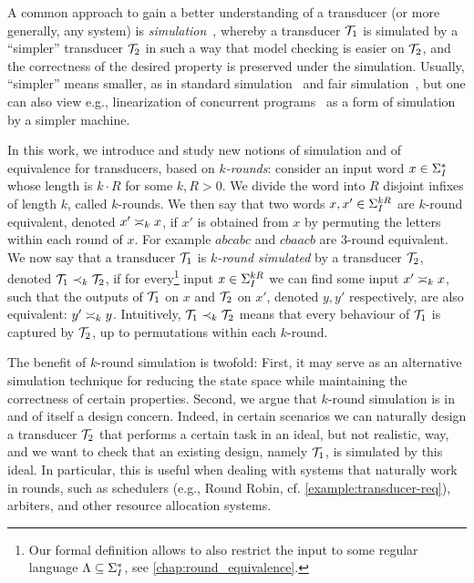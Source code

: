 A common approach to gain a better understanding of a transducer (or more generally, any system) is \emph{simulation}~\cite{Milner1971}, whereby a transducer $\cT_1$ is simulated by a ``simpler'' transducer $\cT_2$ in such a way that model checking is easier on $\cT_2$, and the correctness of the desired property is preserved under the simulation. Usually, ``simpler'' means smaller, as in standard simulation~\cite{Milner1971} and fair simulation~\cite{Henzinger1997}, but one can also view e.g., linearization of concurrent programs~\cite{Herlihy1987} as a form of simulation by a simpler machine.

In this work, we introduce and study new notions of simulation and of equivalence for transducers, based on \emph{$k$-rounds}: consider an input word $x\in \sI^*$ whose length is $k\cdot R$ for some $k,R>0$. We divide the word into $R$ disjoint infixes of length $k$, called $k$-rounds. We then say that two words $x,x'\in \sI^{kR}$ are $k$-round equivalent, denoted $x'\req[k]x$, if $x'$ is obtained from $x$ by permuting the letters within each round of $x$. For example $abcabc$ and $cbaacb$ are $3$-round equivalent. We now say that a transducer $\cT_1$ is \emph{$k$-round simulated} by a transducer $\cT_2$, denoted $\cT_1\prec_{k} \cT_2$, if for every\footnote{Our formal definition allows to also restrict the input to some regular language $\fL\subseteq \sI^*$, see \autoref{chap:round_equivalence}.} input $x\in \sI^{kR}$ we can find some input $x'\req[k]x$, such that the outputs of $\cT_1$ on $x$ and $\cT_2$ on $x'$, denoted $y,y'$ respectively, are also equivalent: $y'\req[k] y$.
Intuitively, $\cT_1\prec_{k}\cT_2$ means that every behaviour of $\cT_1$ is captured by $\cT_2$, up to permutations within each $k$-round. 

The benefit of $k$-round simulation is twofold: First, it may serve as an alternative simulation technique for reducing the state space while maintaining the correctness of certain properties. Second, we argue that $k$-round simulation is in and of itself a design concern. Indeed, in certain scenarios we can naturally design a transducer $\cT_2$ that performs a certain task in an ideal, but not realistic, way, and we want to check that an existing design, namely $\cT_1$, is simulated by this ideal. In particular, this is useful when dealing with systems that naturally work in rounds, such as schedulers (e.g., Round Robin, cf. \autoref{example:transducer-req}), arbiters, and other resource allocation systems.


